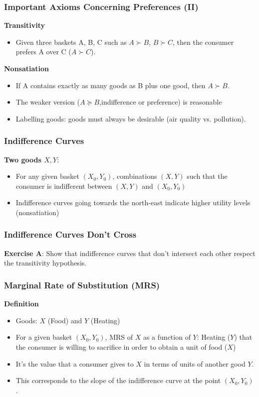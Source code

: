 \documentclass[handout]{beamer}
\begin{document}
\begin{frame}\frametitle{Important Axioms Concerning Preferences (II)}
\textbf{Transitivity}
\begin{itemize}
\item Given three baskets A, B, C  such as  $A\succ B$, $B \succ C$, 
then the consumer prefers A over C ($A \succ C$).
\end{itemize}

\textbf{Nonsatiation}\begin{itemize}
\item If A contains exactly as many goods as B plus one good, then $A \succ B$.
\item The weaker version ($A \succeq B$,indifference or preference) is reasonable  
\item Labelling goods: goods must always be desirable (air quality vs. pollution). 
\end{itemize}


\end{frame}

\begin{frame}\frametitle{Indifference Curves}
\textbf{Two goods $X,Y$}:
\begin{itemize}
\item For any given basket $(X_0,Y_0)$, combinations $(X,Y)$ such that the consumer is indifferent between $(X,Y)$ and $(X_0,Y_0)$
\item Indifference curves going towards the north-east indicate higher utility levels (nonsatiation)
\end{itemize}

\end{frame}

\begin{frame}\frametitle{Indifference Curves Don't Cross}

\textbf{Exercise A}: Show that indifference curves that don't intersect each other respect the transitivity hypothesis.
\end{frame}


\begin{frame}\frametitle{Marginal Rate of Substitution (MRS)}
\textbf{Definition}
\begin{itemize}
\item Goods:  $X$ (Food) and $Y$ (Heating)
\item For a given basket $(X_0, Y_0)$, MRS of $X$ as a function of $Y$: Heating ($Y$) that the consumer is willing to sacrifice in order to obtain a unit of food ($X$)
\item It's the value that a consumer gives to $X$ in terms of units of another good $Y$.
\item This corresponds to the slope of the indifference curve at the point $(X_0,Y_0)$.
\end{itemize}
\end{frame}
\end{document}
